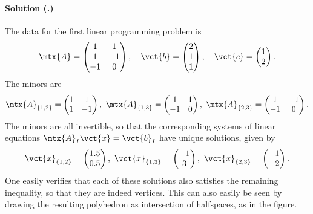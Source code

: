 \documentclass{article}
\newcounter{problemSheetNumber}
\newcounter{problems}
\renewcommand{\solution}[1]{\paragraph{Solution (\theproblemSheetNumber.\theproblems)}\addtocounter{problems}{1}\label{#1}}
\begin{document}
\solution{pr3} The data for the first linear programming problem is
\begin{equation*}
 \mtx{A} = \begin{pmatrix} 1 & 1\\ 1 & -1\\ -1 & 0\end{pmatrix}, \quad
 \vct{b} = \begin{pmatrix} 2\\1\\1 \end{pmatrix}, \quad
 \vct{c} = \begin{pmatrix} 1\\2\end{pmatrix}.
\end{equation*}
The minors are
\begin{equation*}
 \mtx{A}_{\{1,2\}} = \begin{pmatrix} 1 & 1 \\ 1&-1 \end{pmatrix}, \ 
 \mtx{A}_{\{1,3\}} = \begin{pmatrix} 1 & 1 \\ -1&0 \end{pmatrix}, \
 \mtx{A}_{\{2,3\}} = \begin{pmatrix} 1 & -1 \\ -1&0 \end{pmatrix}.
\end{equation*}
The minors are all invertible, so that the corresponding systems of linear equations $\mtx{A}_I\vct{x}=\vct{b}_I$ have unique solutions, given by
\begin{equation*}
 \vct{x}_{\{1,2\}} = \begin{pmatrix} 1.5\\0.5\end{pmatrix}, \ 
 \vct{x}_{\{1,3\}} = \begin{pmatrix} -1\\3\end{pmatrix}, \
 \vct{x}_{\{2,3\}} = \begin{pmatrix} -1\\-2\end{pmatrix}.
\end{equation*}
One easily verifies that each of these solutions also satisfies the remaining inequality, so that they are indeed vertices. This can also easily be seen by drawing the resulting polyhedron as intersection of halfspaces, as in the figure.
\end{document}
